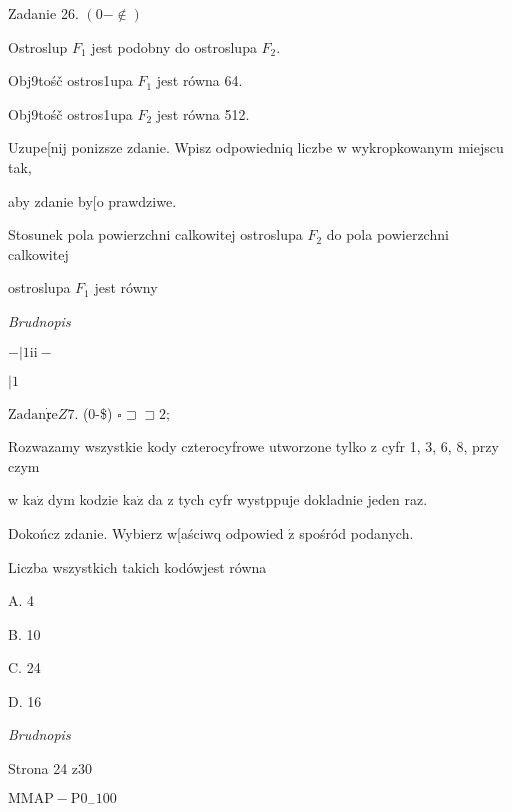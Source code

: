\documentclass[a4paper,12pt]{article}
\begin{document}
Zadanie 26. $(0-\not\in)$

Ostroslup $F_{1}$ jest podobny do ostroslupa $F_{2}.$

Obj9tośč ostros1upa $F_{1}$ jest równa 64.

Obj9tośč ostros1upa $F_{2}$ jest równa 512.

Uzupe[nij ponizsze zdanie. Wpisz odpowiedniq liczbe w wykropkowanym miejscu tak,

aby zdanie by[o prawdziwe.

Stosunek pola powierzchni calkowitej ostroslupa $F_{2}$ do pola powierzchni calkowitej

ostroslupa $F_{1}$ jest równy

{\it Brudnopis}

$-|1\mathrm{i}\mathrm{i}-$

$| 1$

$\mathrm{Z}\mathrm{a}\mathrm{d}\mathrm{a}\mathrm{n}\dot{\mathfrak{x}}\mathrm{e}Z7$. (0-{\$}) $\square \sqsupset\sqsupset 2$;

Rozwazamy wszystkie kody czterocyfrowe utworzone tylko z cyfr 1, 3, 6, 8, przy czym

w $\mathrm{k}\mathrm{a}\dot{\mathrm{z}}$ dym kodzie $\mathrm{k}\mathrm{a}\dot{\mathrm{z}}$ da z tych cyfr wystppuje dokladnie jeden raz.

Dokończ zdanie. Wybierz w[aściwq odpowied $\acute{\mathrm{z}}$ spośród podanych.

Liczba wszystkich takich kodówjest równa

A. 4

B. 10

C. 24

D. 16

{\it Brudnopis}

Strona 24 z30

$\mathrm{M}\mathrm{M}\mathrm{A}\mathrm{P}-\mathrm{P}0_{-}100$
\end{document}
